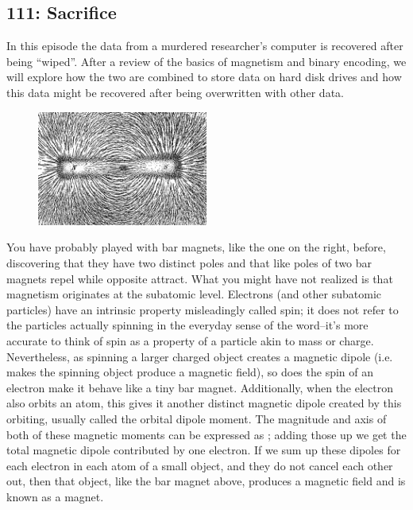 \newpage
\subsection{111: Sacrifice\label{111}}

In this episode the data from a murdered researcher's computer is recovered after being ``wiped''. After a review of the basics of magnetism and binary encoding, we will explore how the two are combined to store data on hard disk drives and how this data might be recovered after being overwritten with other data. \\


	\begin{figure}[H]
	   \centering
	   \includegraphics[width=0.5\textwidth]{season1/111/images/magnet.png} 
	\end{figure}

You have probably played with bar magnets, like the one on the right, before, discovering that they have two distinct poles and that like poles of two bar magnets repel while opposite attract. What you might have not realized is that magnetism originates at the subatomic level. Electrons (and other subatomic particles) have an intrinsic property misleadingly called spin; it does not refer to the particles actually spinning in the everyday sense of the word--it's more accurate to think of spin as a property of a particle akin to mass or charge. Nevertheless, as spinning a larger charged object creates a magnetic dipole (i.e. makes the spinning object produce a magnetic field), so does the spin of an electron make it behave like a tiny bar magnet. Additionally, when the electron also orbits an atom, this gives it another distinct magnetic dipole created by this orbiting, usually called the orbital dipole moment. The magnitude and axis of both of these magnetic moments can be expressed as ; adding those up we get the total magnetic dipole contributed by one electron. If we sum up these dipoles for each electron in each atom of a small object, and they do not cancel each other out, then that object, like the bar magnet above, produces a magnetic field and is known as a magnet. \\

